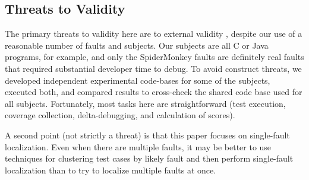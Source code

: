 \subsection{Threats to Validity}

The primary threats to validity here are to external validity
\cite{Threats}, despite our use of a reasonable number of faults and subjects.  Our subjects are all C or
Java programs, for example, and only the SpiderMonkey faults are
definitely real faults that required substantial developer time to debug.  To avoid
construct threats, we developed independent experimental code-bases
for some of the subjects, executed both, and compared results to
cross-check the shared code base used for all subjects.  Fortunately,
most tasks here are straightforward (test execution, coverage
collection, delta-debugging, and calculation of scores).

A second point (not strictly a threat) is that this paper focuses on
single-fault localization.    Even when
there are multiple faults, it may be better to use techniques for
clustering test cases by likely fault 
\cite{Jones07,PLDI13,Podgurski04,ISSRE18} and then perform
single-fault localization than to try to localize multiple faults at
once.

